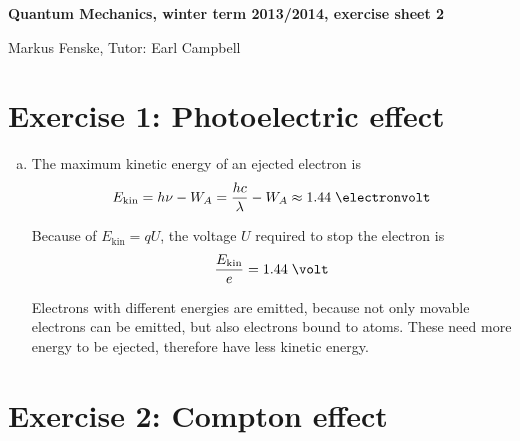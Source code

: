 \documentclass[a4paper,german,12pt,smallheadings]{scrartcl}
\begin{document}
\begin{center}
\bfseries %
\sffamily %
\vspace{-40pt}
Quantum Mechanics, winter term 2013/2014, exercise sheet 2

Markus Fenske, Tutor: Earl Campbell
\vspace{-10pt}
\end{center}

\section*{Exercise 1: Photoelectric effect}

\begin{enumerate}[a)]
  \item
    The maximum kinetic energy of an ejected electron is
    \begin{equation*}
      E_\text{kin} = h \nu - W_A = \frac{hc}{\lambda} - W_A \approx 1.44 \; \electronvolt
    \end{equation*}

    Because of $E_\text{kin} = q U$, the voltage $U$ required to stop the electron is
    \begin{equation*}
      \frac{E_\text{kin}}{e} = 1.44 \; \volt
    \end{equation*}

    Electrons with different energies are emitted, because not only movable
    electrons can be emitted, but also electrons bound to atoms. These need
    more energy to be ejected, therefore have less kinetic energy.


\end{enumerate}

\section*{Exercise 2: Compton effect}
\end{document}
